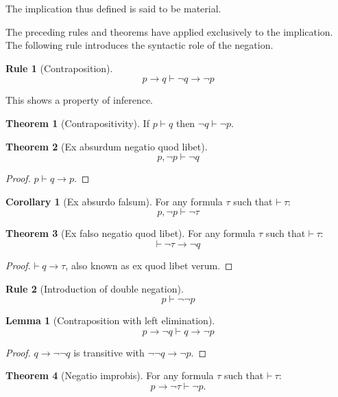 \documentclass{amsbook}
\newcommand{\infers}{\mathrel\vdash}
\newcommand{\theorem}{\mathord\vdash\medspace}
\newcommand{\then}{\mathrel\rightarrow}
\theoremstyle{definition}
\newtheorem{frule}{Rule}[chapter]
\newtheorem{thm}{Theorem}[section]
\newtheorem{lmm}{Lemma}[section]
\newtheorem{crl}{Corollary}[section]
\begin{document}
The implication thus defined is said to be material.

The preceding rules and theorems have applied exclusively to the implication. The following rule introduces the syntactic role of the negation.

\begin{frule}[Contraposition]
    $$p \then q \infers \neg q \then \neg p$$
\end{frule}

This shows a property of inference.

\begin{thm}[Contrapositivity]
    If $p \infers q$ then $\neg q \infers \neg p$.
\end{thm}

\begin{thm}[Ex absurdum negatio quod libet]
    $$p, \neg p \infers \neg q$$
    \begin{proof}
        $p \infers q \then p$.
    \end{proof}
\end{thm}

\begin{crl}[Ex absurdo falsum]
    For any formula $\tau$ such that $\theorem \tau$:
    $$p, \neg p \infers \neg\tau$$
\end{crl}

\begin{thm}[Ex falso negatio quod libet]
    For any formula $\tau$ such that $\theorem \tau$:
    $$\theorem \neg\tau \then \neg q$$
    \begin{proof}
        $\theorem q \then \tau$, also known as ex quod libet verum.
    \end{proof}
\end{thm}

\begin{frule}[Introduction of double negation]
    $$p \infers \neg\neg p$$
\end{frule}

\begin{lmm}[Contraposition with left elimination]
    $$p \then \neg q \infers q \then \neg p$$
    \begin{proof}
        $q \then \neg\neg q$ is transitive with $\neg\neg q \then \neg p$.
    \end{proof}
\end{lmm}

\begin{thm}[Negatio improbis]
    For any formula $\tau$ such that $\theorem \tau$:
    $$p \then \neg \tau \infers \neg p.$$
\end{thm}
\end{document}
